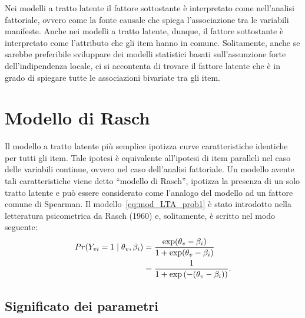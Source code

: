 Nei modelli a tratto latente il fattore sottostante è interpretato come nell'analisi fattoriale, ovvero come la fonte causale che spiega l'associazione tra le variabili manifeste. 
Anche nei modelli a tratto latente, dunque, il fattore sottostante è interpretato come l'attributo che gli item hanno in comune.  
Solitamente, anche se sarebbe preferibile sviluppare dei modelli statistici basati sull'assunzione forte dell'indipendenza locale, ci si accontenta di trovare il fattore latente che è in grado di spiegare tutte le associazioni bivariate tra gli item.  

\section{Modello di Rasch}

Il modello a tratto latente più semplice ipotizza curve caratteristiche identiche per tutti gli item. 
Tale ipotesi è equivalente all'ipotesi di item paralleli nel caso delle variabili continue, ovvero nel caso dell'analisi fattoriale. 
Un modello avente tali caratteristiche viene detto ``modello di Rasch'', ipotizza la presenza di un solo tratto latente e può essere considerato come l'analogo del modello ad un fattore comune di Spearman.  
Il modello~\ref{eq:mod_LTA_prob1} è stato introdotto nella letteratura psicometrica da Rasch (1960) e, solitamente, è scritto nel modo seguente:
\begin{align} 
Pr(Y_{vi} = 1 \mid \theta_v, \beta_i) &= \frac{\exp(\theta_v-\beta_i)}{1+\exp(\theta_v-\beta_i)}\notag\\
&=\frac{1}{1+ \exp\left(-(\theta_v-\beta_i)\right)}.
\label{eq:rasch_model}
\end{align}

\subsection{Significato dei parametri}

